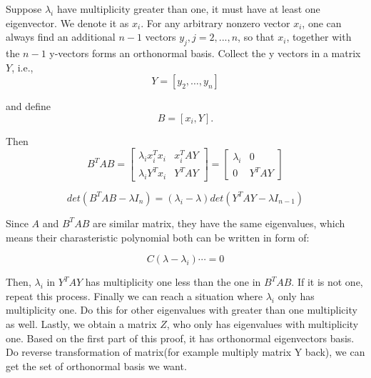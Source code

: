 \documentclass[a4paper]{book}
\newenvironment{proof}[1][Proof]{\begin{trivlist}
\item[\hskip \labelsep {\bfseries #1}]}{\end{trivlist}}
\begin{document}
\begin{proof}
        Suppose $\lambda_{i}$ have multiplicity greater than one, it
        must have at least one eigenvector. We denote it as $x_{i}$. For
        any arbitrary nonzero vector $x_{i}$, one can always find an
        additional $n - 1$ vectors $y_{j}, j = 2, ..., n$, so that
        $x_{i}$, together with the $n - 1$ y-vectors forms an
        orthonormal basis. Collect the y vectors in a matrix $Y$, i.e.,
        \begin{displaymath}
          Y = [y_{2}, \ldots , y_{n}]
        \end{displaymath}

        and define
        \begin{displaymath}
          B = [ x_{i}, Y].
        \end{displaymath}

        Then
        \begin{displaymath}
          B^{T}AB =
          \begin{bmatrix}
            \lambda_{i}x_{i}^{T}x_{i} & x_{i}^{T}AY \\
            \lambda_{i}Y^{T}x_{i}     & Y^{T}AY
          \end{bmatrix}
          = 
          \begin{bmatrix}
            \lambda_{i} & 0 \\
            0           & Y^{T}AY
          \end{bmatrix}
        \end{displaymath}

        \begin{displaymath}
          det(B^{T}AB - \lambda I_{n}) = (\lambda_{i} -
          \lambda)det(Y^{T}AY - \lambda I_{n - 1})
        \end{displaymath}

        Since $A$ and $B^{T}AB$ are similar matrix, they have the same
        eigenvalues, which means their charasteristic polynomial both
        can be written in form of:

        \begin{displaymath}
          C(\lambda - \lambda_{i})\cdots = 0
        \end{displaymath}

        Then, $\lambda_{i}$ in $Y^{T}AY$ has multiplicity one less than
        the one in $B^{T}AB$. If it is not one, repeat this process.
        Finally we can reach a situation where $\lambda_{i}$ only has
        multiplicity one. Do this for other eigenvalues with greater
        than one multiplicity as well. Lastly, we obtain a matrix $Z$,
        who only has eigenvalues with multiplicity one. Based on the
        first part of this proof, it has orthonormal eigenvectors basis.
        Do reverse transformation of matrix(for example multiply matrix
        Y back), we can get the set of orthonormal basis we want.
      \end{proof}
\end{document}
